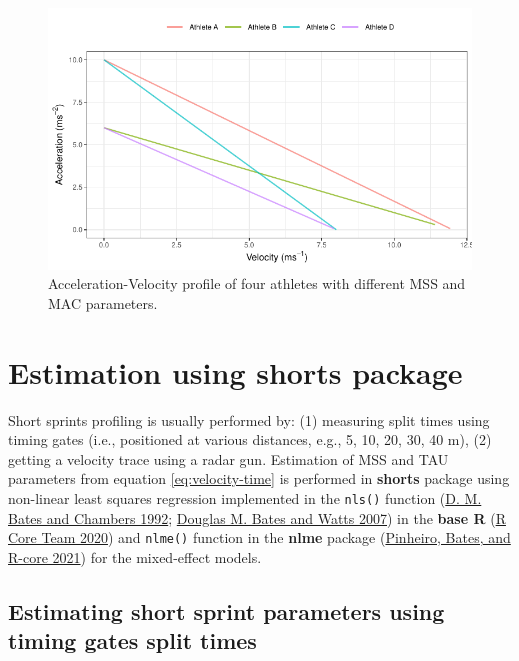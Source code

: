 \documentclass[fleqn,10pt]{wlpeerj} %
\begin{document}
\begin{figure}

{\centering \includegraphics[width=0.9\linewidth]{paper_files/figure-latex/four-athletes-profile-1} 

}

\caption{Acceleration-Velocity profile of four athletes with different MSS and MAC parameters.}\label{fig:four-athletes-profile}
\end{figure}

\normalsize

\hypertarget{estimation-using-shorts-package}{%
\section{Estimation using shorts package}\label{estimation-using-shorts-package}}

Short sprints profiling is usually performed by: (1) measuring split times using timing gates (i.e., positioned at various distances, e.g., 5, 10, 20, 30, 40 m), (2) getting a velocity trace using a radar gun. Estimation of MSS and TAU parameters from equation \eqref{eq:velocity-time} is performed in \textbf{shorts} package using non-linear least squares regression implemented in the \texttt{nls()} function (\protect\hyperlink{ref-batesNonlinearModels1992}{D. M. Bates and Chambers 1992}; \protect\hyperlink{ref-batesNonlinearRegressionAnalysis2007}{Douglas M. Bates and Watts 2007}) in the \textbf{base R} (\protect\hyperlink{ref-R-base}{R Core Team 2020}) and \texttt{nlme()} function in the \textbf{nlme} package (\protect\hyperlink{ref-R-nlme}{Pinheiro, Bates, and R-core 2021}) for the mixed-effect models.

\hypertarget{estimating-short-sprint-parameters-using-timing-gates-split-times}{%
\subsection{Estimating short sprint parameters using timing gates split times}\label{estimating-short-sprint-parameters-using-timing-gates-split-times}}
\end{document}
